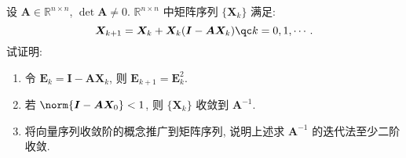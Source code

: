 \documentclass[lang = zh]{iwork}
\begin{document}
\begin{prob}
  设 $\bm{A} \in \mathbb{R}^{n \times n}$, $\det{\bm{A}} \neq 0$. $\mathbb{R}^{n \times n}$ 中矩阵序列 $\{\bm{X}_k\}$ 满足:
  \begin{equation*}
    \bm{X}_{k + 1} = \bm{X}_k + \bm{X}_k (\bm{I} - \bm{A} \bm{X}_k) \qc
    k = 0, 1, \cdots.
  \end{equation*}
  试证明:
  \begin{enumerate}
    \item 令 $\bm{E}_k = \bm{I} - \bm{A} \bm{X}_k$, 则 $\bm{E}_{k + 1} = \bm{E}_k^2$.
    \item 若 $\norm{\bm{I} - \bm{A} \bm{X}_0} < 1$, 则 $\{\bm{X}_k\}$ 收敛到 $\bm{A}^{-1}$.
    \item 将向量序列收敛阶的概念推广到矩阵序列, 说明上述求 $\bm{A}^{-1}$ 的迭代法至少二阶收敛.
  \end{enumerate}

\end{prob}
\end{document}

